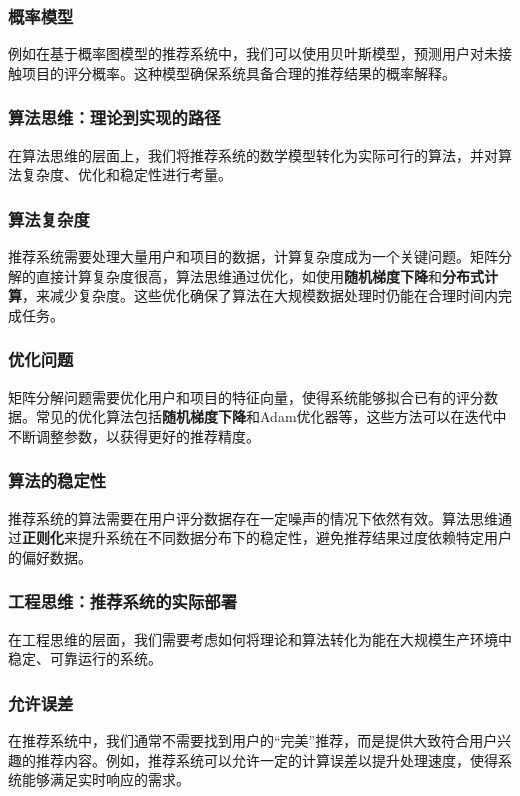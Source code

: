 \subsubsection*{概率模型}
例如在基于概率图模型的推荐系统中，我们可以使用贝叶斯模型，预测用户对未接触项目的评分概率。这种模型确保系统具备合理的推荐结果的概率解释。

\subsubsection{ 算法思维：理论到实现的路径}

在算法思维的层面上，我们将推荐系统的数学模型转化为实际可行的算法，并对算法复杂度、优化和稳定性进行考量。

\subsubsection*{算法复杂度}

推荐系统需要处理大量用户和项目的数据，计算复杂度成为一个关键问题。矩阵分解的直接计算复杂度很高，算法思维通过优化，如使用{\bf 随机梯度下降}和{\bf 分布式计算}，来减少复杂度。这些优化确保了算法在大规模数据处理时仍能在合理时间内完成任务。

\subsubsection*{优化问题}

矩阵分解问题需要优化用户和项目的特征向量，使得系统能够拟合已有的评分数据。常见的优化算法包括{\bf 随机梯度下降}和{Adam}优化器等，这些方法可以在迭代中不断调整参数，以获得更好的推荐精度。

\subsubsection*{算法的稳定性}
推荐系统的算法需要在用户评分数据存在一定噪声的情况下依然有效。算法思维通过{\bf 正则化}来提升系统在不同数据分布下的稳定性，避免推荐结果过度依赖特定用户的偏好数据。

\subsubsection{ 工程思维：推荐系统的实际部署}

在工程思维的层面，我们需要考虑如何将理论和算法转化为能在大规模生产环境中稳定、可靠运行的系统。

\subsubsection*{允许误差}
在推荐系统中，我们通常不需要找到用户的“完美”推荐，而是提供大致符合用户兴趣的推荐内容。例如，推荐系统可以允许一定的计算误差以提升处理速度，使得系统能够满足实时响应的需求。

